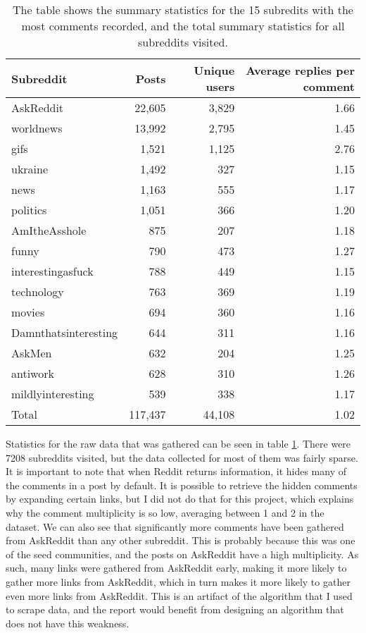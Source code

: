 \documentclass[
]{article}
\begin{document}
\begin{table}

\caption{\label{tab:rawdata}The table shows the summary statistics for the 15 subredits with the most comments recorded, and the total summary statistics for all subreddits visited.}
\centering
\begin{tabular}[t]{lrrr}
\toprule
Subreddit & Posts & Unique users & Average replies per comment\\
\midrule
AskReddit & 22,605 & 3,829 & 1.66\\
worldnews & 13,992 & 2,795 & 1.45\\
gifs & 1,521 & 1,125 & 2.76\\
ukraine & 1,492 & 327 & 1.15\\
news & 1,163 & 555 & 1.17\\
\addlinespace
politics & 1,051 & 366 & 1.20\\
AmItheAsshole & 875 & 207 & 1.18\\
funny & 790 & 473 & 1.27\\
interestingasfuck & 788 & 449 & 1.15\\
technology & 763 & 369 & 1.19\\
\addlinespace
movies & 694 & 360 & 1.16\\
Damnthatsinteresting & 644 & 311 & 1.16\\
AskMen & 632 & 204 & 1.25\\
antiwork & 628 & 310 & 1.26\\
mildlyinteresting & 539 & 338 & 1.17\\
\midrule
\addlinespace
Total & 117,437 & 44,108 & 1.02\\
\bottomrule
\end{tabular}
\end{table}

Statistics for the raw data that was gathered can be seen in table \ref{tab:rawdata}. There were 7208 subreddits visited, but the data collected for most of them was fairly sparse. It is important to note that when Reddit returns information, it hides many of the comments in a post by default. It is possible to retrieve the hidden comments by expanding certain links, but I did not do that for this project, which explains why the comment multiplicity is so low, averaging between 1 and 2 in the dataset. We can also see that significantly more comments have been gathered from AskReddit than any other subreddit. This is probably because this was one of the seed communities, and the posts on AskReddit have a high multiplicity. As such, many links were gathered from AskReddit early, making it more likely to gather more links from AskReddit, which in turn makes it more likely to gather even more links from AskReddit. This is an artifact of the algorithm that I used to scrape data, and the report would benefit from designing an algorithm that does not have this weakness.
\end{document}

